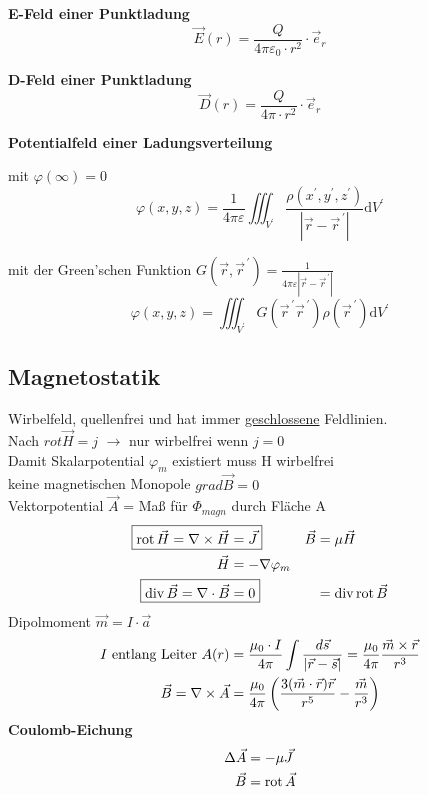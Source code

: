 \textbf{E-Feld einer Punktladung}
\[ \vec{E}(r) = \dfrac{Q}{4 \pi \varepsilon_0 \cdot r^2}\cdot\vec{e}_r \]

\textbf{D-Feld einer Punktladung}
\[ \vec{D}(r) = \dfrac{Q}{4 \pi \cdot r^2}\cdot\vec{e}_r \]

\textbf{Potentialfeld einer Ladungsverteilung}

mit $\varphi(\infty)=0$
\[
    \varphi(x, y, z)=\frac{1}{4 \pi \varepsilon} \iiint_{V^{\prime}}
    \frac{\rho\left(x^{\prime}, y^{\prime},
        z^{\prime}\right)}{\left|\vec{r}-\vec{r}^{\,\prime}\right|} \mathrm{d}
    V^{\prime}
\]

mit der Green'schen Funktion $G\left(\vec{r}, \vec{r}^{\,\prime}\right)=\frac{1}{4 \pi \varepsilon\left|\vec{r}-\vec{r}^{\,\prime}\right|}$
\[\varphi(x, y, z)=\iiint_{V^{\prime}} G\left(\vec{r}^{\,\prime} \vec{r}^{\,\prime}\right) \rho\left(\vec{r}^{\,\prime}\right) \mathrm{d} V^{\prime}\]


\subsection{Magnetostatik}
\textbullet Wirbelfeld, quellenfrei und hat immer \underline{geschlossene} Feldlinien.\\
\textbullet Nach $rot \vec{H} = j$ $\rightarrow$ nur wirbelfrei wenn $j = 0$\\
\textbullet Damit Skalarpotential $ \varphi_m$ existiert muss H wirbelfrei\\
\textbullet keine magnetischen Monopole $grad \vec{B} = 0$\\
\textbullet Vektorpotential $ \vec{A}$ = Maß für $\Phi_{magn} $ durch Fläche A
\begin{align*}
    \Aboxed{\oprot \vec{H} = \nabla \times \vec{H} & = \vec{J} }          & \vec{B} & = \mu \vec{H}           \\
    \vec{H}                                        & = - \nabla \varphi_m &                                   \\
    \Aboxed{\opdiv \vec{B} = \nabla \cdot \vec{B}  & = 0 }                &         & = \opdiv \oprot \vec{B}
\end{align*}
Dipolmoment $ \vec{m} = I \cdot \vec{a}$
\begin{align*}
    I\textnormal{ entlang Leiter } A(r) & = \frac{\mu_0 \cdot I}{4 \pi} \int \frac{d \vec{s}}{| \vec{r} - \vec{s}|} = \frac{ \mu_0}{4 \pi} \frac{\vec{m} \times \vec{r}}{r^3} \\
    \vec{B} = \nabla \times \vec{A}     & = \frac{\mu_0}{4 \pi} \left(\frac{3(\vec{m} \cdot \vec{r})\vec{r}}{r^5} - \frac{\vec{m}}{r^3}\right)
\end{align*}
\textbf{Coulomb-Eichung}
\begin{align*}
    \Delta \vec{A} & = - \mu \vec{J}  \\
    \vec{B}        & = \operatorname{rot} \vec{A}
\end{align*}

